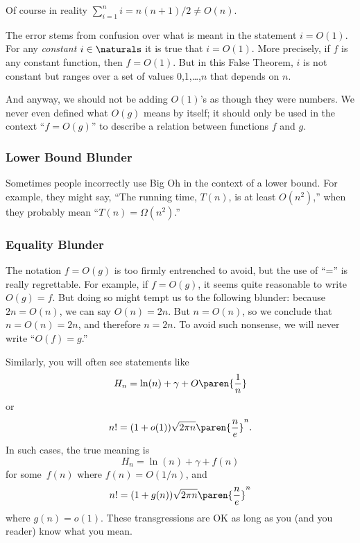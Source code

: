 Of course in reality $\sum_{i=1}^n i = n(n+1)/2 \neq O(n)$.

The error stems from confusion over what is meant in the statement $i =
O(1)$.  For any \emph{constant} $i\in \naturals$ it is true that $i =
O(1)$.  More precisely, if $f$ is any constant function, then $f = O(1)$.
But in this False Theorem, $i$ is not constant but ranges over a set of
values 0,1,\dots,$n$ that depends on $n$.

And anyway, we should not be adding $O(1)$'s as though they were numbers.
We never even defined what $O(g)$ means by itself; it should only be used
in the context ``$f = O(g)$'' to describe a relation between functions $f$
and $g$.

\subsubsection{Lower Bound Blunder}

Sometimes people incorrectly use Big Oh in the context of a lower
bound.  For example, they might say, ``The running time, $T(n)$, is at
least $O(n^2)$,'' when they probably mean ``$T(n) = \Omega(n^2)$.''

\subsubsection{Equality Blunder}

The notation $f = O(g)$ is too firmly entrenched to avoid, but the use of
``='' is really regrettable.  For example, if $f = O(g)$, it seems quite
reasonable to write $O(g) = f$.  But doing so might tempt us to the
following blunder: because $2n = O(n)$, we can say $O(n) = 2n$.  But $n =
O(n)$, so we conclude that $n = O(n) = 2n$, and therefore $n = 2n$.  To
avoid such nonsense, we will never write ``$O(f) = g$.''

Similarly, you will often see statements like
\begin{equation*}
    H_n = \ln(n) + \gamma + O\paren{\frac{1}{n}}
\end{equation*}
or
\begin{equation*}
    n! = (1 + o(1)) \sqrt{2\pi n} \paren{\frac{n}{e}}^n.
\end{equation*}
In such cases, the true meaning is
\begin{equation*}
    H_n = \ln(n) + \gamma + f(n)
\end{equation*}
for some~$f(n)$ where $f(n) = O(1/n)$, and
\begin{equation*}
    n! = (1 + g(n)) \sqrt{2\pi n} \paren{\frac{n}{e}}^n
\end{equation*}
where $g(n) = o(1)$.  These transgressions are OK as long as you (and
you reader) know what you mean.

